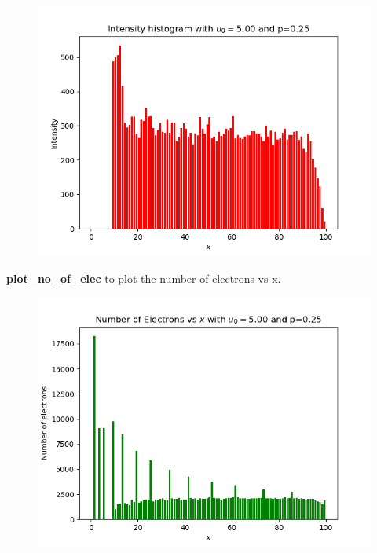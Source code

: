 \documentclass[11pt, a4paper]{article}
\begin{document}
   \begin{figure}[!tbh]
   	\centering
   	\includegraphics[scale=0.5]{fig0.png}  %

   	\label{fig:sample}
   \end{figure} 


{\bf plot\_no\_of\_elec} to plot the number of electrons vs x.
 
   \begin{figure}[!tbh]
   	\centering
   	\includegraphics[scale=0.5]{fig1.png}  %

   	\label{fig:sample}
   \end{figure} 
   
\end{document}
